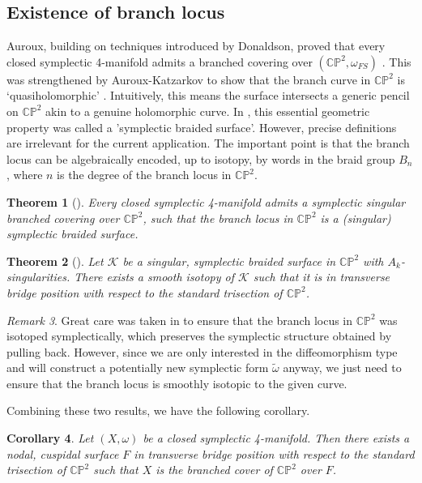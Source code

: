 \documentclass[11pt]{amsart}
\newtheorem{theorem}{Theorem}[section]
\newtheorem{corollary}[theorem]{Corollary}
\theoremstyle{definition}
\theoremstyle{remark}
\newtheorem{remark}[theorem]{Remark}
\numberwithin{equation}{section}
\newcommand{\cK}{\mathcal{K}}
\newcommand{\CP}{\mathbb{CP}}
\begin{document}
\subsection{Existence of branch locus}

Auroux, building on techniques introduced by Donaldson, proved that every closed symplectic 4-manifold admits a branched covering over $(\CP^2,\omega_{FS})$ \cite{Auroux-branched}.  This was strengthened by Auroux-Katzarkov to show that the branch curve in $\CP^2$ is `quasiholomorphic' \cite{AK-branched}.  Intuitively, this means the surface intersects a generic pencil on $\CP^2$ akin to a genuine holomorphic curve.  In \cite{LMS}, this essential geometric property was called a 'symplectic braided surface'.  However, precise definitions are irrelevant for the current application.  The important point is that the branch locus can be algebraically encoded, up to isotopy, by words in the braid group $B_n$, where $n$ is the degree of the branch locus in $\CP^2$.

\begin{theorem}[\cite{AK-branched}]
Every closed symplectic 4-manifold admits a symplectic singular branched covering over $\CP^2$, such that the branch locus in $\CP^2$ is a (singular) symplectic braided surface.
\end{theorem}

\begin{theorem}[\cite{LC-symp-surfaces}]
    Let $\cK$ be a singular, symplectic braided surface in $\CP^2$ with $A_k$-singularities.  There exists a smooth isotopy of $\cK$ such that it is in transverse bridge position with respect to the standard trisection of $\CP^2$.
\end{theorem}

\begin{remark}
Great care was taken in \cite{LMS} to ensure that the branch locus in $\CP^2$ was isotoped symplectically, which preserves the symplectic structure obtained by pulling back.  However, since we are only interested in the diffeomorphism type and will construct a potentially new symplectic form $\widetilde{\omega}$ anyway, we just need to ensure that the branch locus is smoothly isotopic to the given curve.
\end{remark}

Combining these two results, we have the following corollary.

\begin{corollary}
Let $(X,\omega)$ be a closed symplectic 4-manifold.  Then there exists a nodal, cuspidal surface $F$ in transverse bridge position with respect to the standard trisection of $\CP^2$ such that $X$ is the branched cover of $\CP^2$ over $F$.
\end{corollary}
\end{document}
